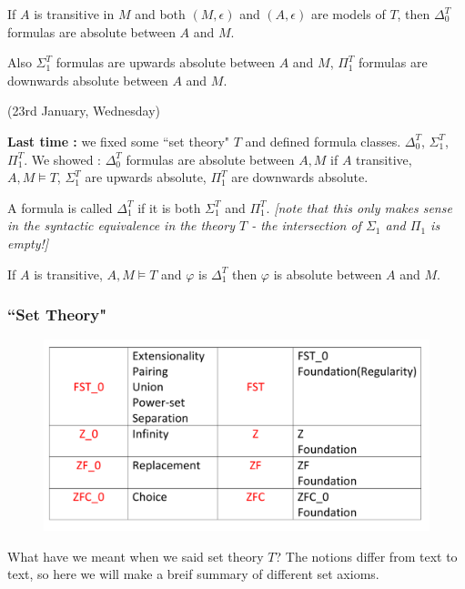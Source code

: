 \documentclass[12pt,a4paper]{article}
\begin{document}
\corr If $A$ is transitive in $M$ and both $(M, \epsilon)$ and $(A, \epsilon)$ are models of $T$, then $\Delta_0^T$ formulas are absolute between $A$ and $M$.

\quad Also $\Sigma_1^T$ formulas are upwards absolute between $A$ and $M$, $\Pi_1^T$ formulas are downwards absolute between $A$ and $M$. 
\s

\newday

(23rd January, Wednesday)
\s

\textbf{Last time :} we fixed some ``set theory" $T$ and defined formula classes. $\Delta_0^T$, $\Sigma_1^T$, $\Pi_1^T$. We showed : $\Delta_0^T$ formulas are absolute between $A,M$ if $A$ transitive, $A,M\models T$, $\Sigma_1^T$ are upwards absolute, $\Pi_1^T$ are downwards absolute.
\s

 A formula is called $\Delta_1^T$ if it is both $\Sigma_1^T$ and $\Pi_1^T$. \emph{[note that this only makes sense in the syntactic equivalence in the theory $T$ - the intersection of $\Sigma_1$ and $\Pi_1$ is empty!]}
\s

\corr If $A$ is transitive, $A,M\models T$ and $\varphi$ is $\Delta_1^T$ then $\varphi$ is absolute between $A$ and $M$.
\s

\subsubsection*{``Set Theory"}

\begin{figure}[h]
\begin{center}
    \includegraphics[scale=0.2]{1}
\end{center}
\end{figure}

What have we meant when we said set theory $T$? The notions differ from text to text, so here we will make a breif summary of different set axioms.
\s
\end{document}
